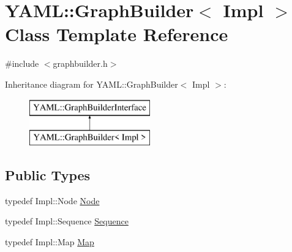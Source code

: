\hypertarget{class_y_a_m_l_1_1_graph_builder}{}\section{Y\+A\+ML\+::Graph\+Builder$<$ Impl $>$ Class Template Reference}
\label{class_y_a_m_l_1_1_graph_builder}


{\ttfamily \#include $<$graphbuilder.\+h$>$}

Inheritance diagram for Y\+A\+ML\+::Graph\+Builder$<$ Impl $>$\+:\begin{figure}[H]
\begin{center}
\leavevmode
\includegraphics[height=2.000000cm]{class_y_a_m_l_1_1_graph_builder}
\end{center}
\end{figure}
\subsection*{Public Types}
\begin{DoxyCompactItemize}
\item 
typedef Impl\+::\+Node \mbox{\hyperlink{class_y_a_m_l_1_1_graph_builder_a6d71230d66f879007be4581d5a7c9c85}{Node}}
\item 
typedef Impl\+::\+Sequence \mbox{\hyperlink{class_y_a_m_l_1_1_graph_builder_ad0fae4935660f3c70c1b7b5a56e97d8a}{Sequence}}
\item 
typedef Impl\+::\+Map \mbox{\hyperlink{class_y_a_m_l_1_1_graph_builder_af58f15b2d877d52cc93fd1d28a754207}{Map}}
\end{DoxyCompactItemize}
